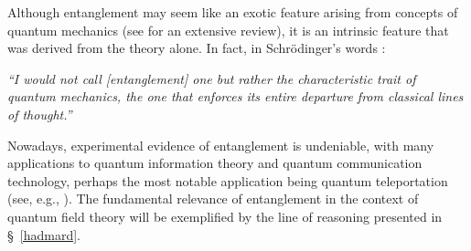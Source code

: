 \documentclass[
12pt,		%
openright,	%
twoside,  %
a4paper,			%
chapter=TITLE,		%
english,			%
french,				%
spanish,			%
brazil				%
]{USPSC-classe/USPSC}
\begin{document}
\begin{apendicesenv}
Although entanglement may seem like an exotic feature arising from concepts of quantum mechanics (see \cite{Horodecki2009} for an extensive review), it is an intrinsic feature that was derived from the theory alone. In fact, in Schrödinger's words \cite{Schrödinger1935}:

\noindent\textit{``I would not call [entanglement] one but rather the characteristic trait of quantum mechanics, the one that enforces its entire departure from classical lines of thought.''}

Nowadays, experimental evidence of entanglement is undeniable, with many applications to quantum information theory and quantum communication technology, perhaps the most notable application being quantum teleportation (see, e.g., \cite{Bouwmeester1997, Ren2017}). The fundamental relevance of entanglement in the context of quantum field theory will be exemplified by the line of reasoning presented in \S~\ref{hadmard}.
 






\end{apendicesenv}

\printindex
\end{document}
